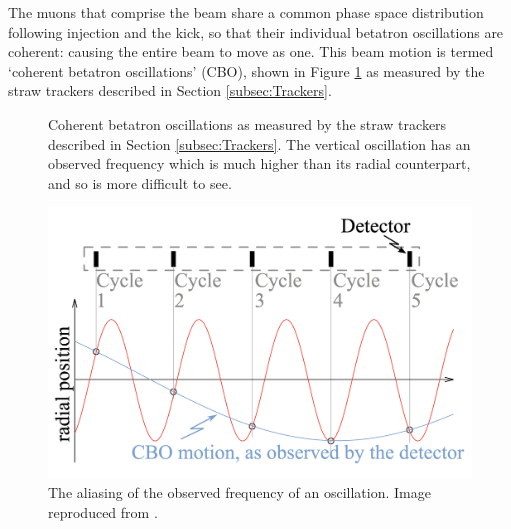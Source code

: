 The  muons that comprise the beam share a common phase space distribution following injection and the kick, so that their individual betatron oscillations are coherent: causing the entire beam to move as one. This beam motion is termed `coherent betatron oscillations' (CBO), shown in Figure \ref{fig:CBO} as measured by the straw trackers described in Section \ref{subsec:Trackers}. 

\begin{figure}[t!]
\centering{}
\caption{Coherent betatron oscillations as measured by the straw trackers described in Section \ref{subsec:Trackers}. The vertical oscillation has an observed frequency which is much higher than its radial counterpart, and so is more difficult to see.}
\label{fig:CBO}
\end{figure} 
\begin{figure}[t!]
\centering{}
\includegraphics[trim={0 0 0 0},clip,width=.59\textwidth]{Images/Chapter3/CBO_diagram.png}
\caption{The aliasing of the observed frequency of an oscillation. Image reproduced from \cite{KimCBO}.}
\label{fig:Aliasing}
\end{figure} 

